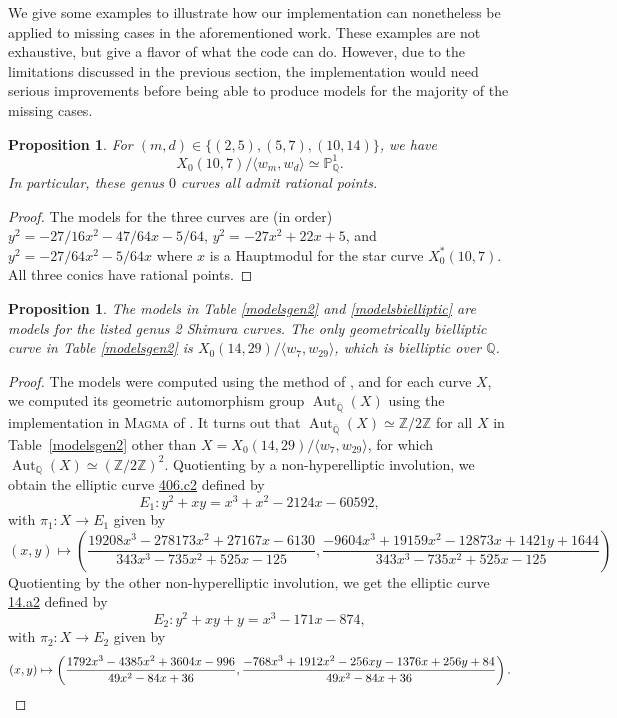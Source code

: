 \documentclass[12pt]{amsart}
\renewcommand{\P}{\mathbb{P}}
\newcommand{\Q}{\mathbb{Q}}
\newcommand{\Z}{\mathbb{Z}}
\newcommand{\Qbar}{{\overline{\Q}}}
\DeclareMathOperator{\Aut}{Aut}
\numberwithin{equation}{subsection}
\theoremstyle{plain}\newtheorem{ithm}{Theorem}
\theoremstyle{plain}\newtheorem{iprop}[ithm]{Proposition}
\newtheorem{proposition}[equation]{Proposition}
\theoremstyle{definition}
\theoremstyle{remark}
\newcommand{\Curve}[2]{X_0({#1},{#2})} %
\newcommand{\StarCurve}[2]{X_0^*({#1},{#2})} %
\newcommand{\Magma}{\textsc{Magma}}
\begin{document}
We give some examples to illustrate how our implementation can nonetheless be applied to missing cases in the aforementioned work. 
These examples are not exhaustive, but  give a flavor of what the code can do.  However, due to the limitations discussed in the previous section, the implementation would need serious improvements before being able to produce models for the majority of the missing cases.

\begin{proposition} \label{prop:rational genus 0}
For $(m,d) \in \{ (2,5), (5,7), (10,14) \}$, we have
\begin{equation}
    \Curve{10}{7}/\langle w_{m}, w_{d}\rangle \simeq \P^1_{\Q}.
\end{equation}
In particular, these genus $0$ curves all admit rational points.
\end{proposition}

\begin{proof}
The models for the three curves are (in order)  
   $ y^2 = -27/16x^2 -47/64x-5/64$, 
 $ y^2 = -27x^2 + 22x+ 5$,
and $y^2 = -27/64x^2 - 5/64x $
where $x$ is a Hauptmodul for the star curve $\StarCurve{10}{7}$.
All three conics have rational points.
\end{proof}


\begin{proposition}
The models in Table \ref{modelsgen2} and \ref{modelsbielliptic} are models for the listed genus 2 Shimura curves. 
The only geometrically bielliptic curve in Table \ref{modelsgen2} is $\Curve{14}{29}/\langle w_7, w_{29} \rangle$, which is bielliptic over $\Q$.
\end{proposition}

\begin{proof}
    The models were computed using the method of \cite{GY17}, and for each curve $X$, we computed its geometric automorphism group $\Aut_{\Qbar}(X)$ using the implementation in \Magma{} of \cite{AutGroup}. It turns out that $\Aut_{\Qbar}(X) \simeq \Z / 2 \Z$ for all $X$ in Table~\ref{modelsgen2} other than $X = \Curve{14}{29}/\langle w_7, w_{29} \rangle$, for which $\Aut_{\Q}(X) \simeq (\Z / 2 \Z)^2$. Quotienting by a non-hyperelliptic involution, we obtain the elliptic curve \href{https://www.lmfdb.org/EllipticCurve/Q/406/c/2}{406.c2} defined by 
    $$
    E_1 : y^2 + xy = x^3 + x^2 - 2124x - 60592,
    $$
    with $\pi_1 : X \to E_1$ given by 
    {\small
    \begin{equation*}
    (x,y) \mapsto \left( \frac{19208 x^3 - 278173 x^2 + 27167 x - 6130}{343 x^3 - 735 x^2 + 525 x - 125}, \frac{-9604x^3 + 19159 x^2 - 12873 x + 1421 y + 1644}{343 x^3 - 735 x^2 + 525 x - 125} \right)
    \end{equation*}}
    Quotienting by the other non-hyperelliptic involution, we get the elliptic curve \href{https://www.lmfdb.org/EllipticCurve/Q/14/a/2}{14.a2} defined by
    $$E_2 : y^2 + xy + y = x^3 - 171x - 874,$$
    with $\pi_2 : X \to E_2$ given by 
    {\small
    \[(x,y) \mapsto  \left( \frac{1792x^3 - 4385x^2 + 3604x - 996}{49x^2 - 84x + 36},  
    \frac{-768x^3 + 1912x^2 - 256xy - 1376x + 256y + 84}{49x^2 - 84x + 36}\right).\qedhere \]
    }
\end{proof}
\end{document}
